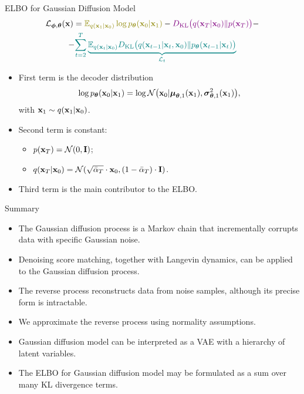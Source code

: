 \documentclass{beamer}
\begin{document}
\begin{frame}{ELBO for Gaussian Diffusion Model}
        \vspace{-0.5cm}
        \begin{multline*}
            \cL_{\bphi, \btheta}(\bx) =  {\color{olive}\bbE_{q(\bx_1 | \bx_0)} \log \pt(\bx_0 | \bx_1)} - {\color{violet}\KL\bigl(q(\bx_T | \bx_0) \| p(\bx_T)\bigr)} - \\
            - {\color{teal}\sum_{t=2}^T \underbrace{ \bbE_{q(\bx_t | \bx_0)} \KL \bigl(q(\bx_{t-1} | \bx_t, \bx_0) \| \pt(\bx_{t-1} | \bx_t)\bigr)}_{\cL_t}}
        \end{multline*}
        \vspace{-0.5cm}
    \eqpause
    \begin{itemize}
        \item {\color{olive}First term} is the decoder distribution
        \[
            \log p_{\boldsymbol{\theta}}(\mathbf{x}_0 | \mathbf{x}_1) = \log \mathcal{N} \bigl(\mathbf{x}_0 | \boldsymbol{\mu}_{\boldsymbol{\theta}, 1}(\mathbf{x}_1), \boldsymbol{\sigma}_{\boldsymbol{\theta}, 1}^2(\mathbf{x}_1)\bigr),
        \] 
        with $\mathbf{x}_1 \sim q(\mathbf{x}_1 | \mathbf{x}_0)$.
        \eqpause
        \item {\color{violet}Second term} is constant: 
        \begin{itemize}
            \item $p(\mathbf{x}_T) = \mathcal{N}(0, \mathbf{I})$;
            \item $q(\mathbf{x}_T | \mathbf{x}_0) = \mathcal{N}(\sqrt{\bar{\alpha}_T} \cdot \mathbf{x}_0, (1 - \bar{\alpha}_T) \cdot \mathbf{I})$.
        \end{itemize}
        \eqpause
        \item {\color{teal}Third term} is the main contributor to the ELBO.
    \end{itemize}
\end{frame}
\begin{frame}{Summary}
	\begin{itemize}
		\item The Gaussian diffusion process is a Markov chain that incrementally corrupts data with specific Gaussian noise.
		\vfill
		\item Denoising score matching, together with Langevin dynamics, can be applied to the Gaussian diffusion process.
		\vfill
		\item The reverse process reconstructs data from noise samples, although its precise form is intractable.
        \vfill 
        \item We approximate the reverse process using normality assumptions.     
        \vfill
        \item Gaussian diffusion model can be interpreted as a VAE with a hierarchy of latent variables.
        \vfill
        \item The ELBO for Gaussian diffusion model may be formulated as a sum over many KL divergence terms.
	\end{itemize}
\end{frame}
\end{document}
